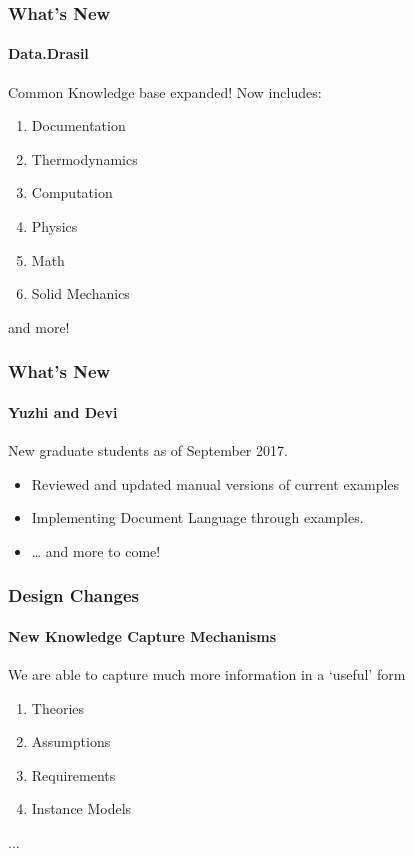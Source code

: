 \documentclass{beamer}
\begin{document}
\begin{frame}

\frametitle{What's New}

\framesubtitle{Data.Drasil}

Common Knowledge base expanded! Now includes:
\begin{enumerate}
\item Documentation
\item Thermodynamics 
\item Computation
\item Physics
\item Math
\item Solid Mechanics
\end{enumerate}
and more!

\end{frame}


\begin{frame}

\frametitle{What's New}
\framesubtitle{Yuzhi and Devi}

New graduate students as of September 2017.

\begin{itemize}
\item Reviewed and updated manual versions of current examples
\item Implementing Document Language through examples.
\item \ldots{} and more to come!
\end{itemize}

\end{frame}


\begin{frame}

\frametitle{Design Changes}
\framesubtitle{New Knowledge Capture Mechanisms}

We are able to capture much more information in a `useful' form

\begin{enumerate}
	\item Theories
	\item Assumptions
	\item Requirements
	\item Instance Models
\end{enumerate}
...

\end{frame}
\end{document}

